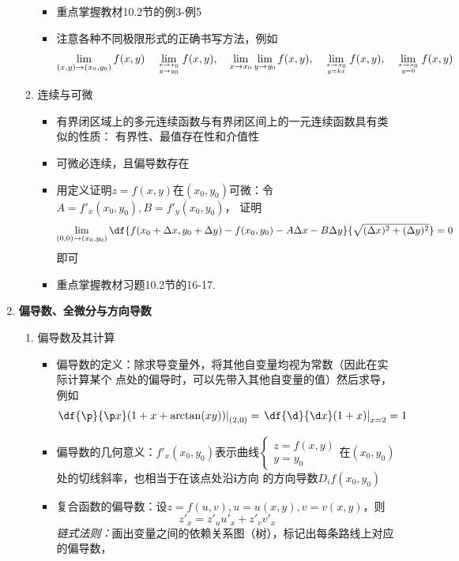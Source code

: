 \begin{enumerate}
\begin{enumerate}[(1)]
\begin{itemize}
      \item 重点掌握教材10.2节的例3-例5
      \item 注意各种不同极限形式的正确书写方法，例如
      $$\lim\limits_{(x,y)\to(x_0,y_0)}f(x,y)\quad
      \lim\limits_{x\to x_0\atop y\to y_0}f(x,y),\quad
      \lim\limits_{x\to x_0}\lim\limits_{y\to y_0}f(x,y),\quad
      \lim\limits_{x\to x_0\atop y=kx}f(x,y),\quad
      \lim\limits_{x\to x_0\atop y=0}f(x,y)
      $$
    \end{itemize}
    \item 连续与可微
    \begin{itemize}
      \item 有界闭区域上的多元连续函数与有界闭区间上的一元连续函数具有类似的性质：
      有界性、最值存在性和介值性
      \item 可微必连续，且偏导数存在
      \item 用定义证明$z=f(x,y)$在$(x_0,y_0)$可微：令$A=f'_x(x_0,y_0),B=f'_y(x_0,y_0)$，
      证明
      $$\lim\limits_{(0,0)\to(x_0,y_0)}
      \df{f(x_0+\Delta x,y_0+\Delta y)-f(x_0,y_0)
      -A\Delta x-B\Delta
      y}{\sqrt{(\Delta x)^2+(\Delta y)^2}}=0$$
      即可
      \item 重点掌握教材习题10.2节的16-17.
    \end{itemize}
  \end{enumerate}
  \item {\bf 偏导数、全微分与方向导数}
  \begin{enumerate}[(1)]
    \item 偏导数及其计算
    \begin{itemize}
      \item 偏导数的定义：除求导变量外，将其他自变量均视为常数（因此在实际计算某个
      点处的偏导时，可以先带入其他自变量的值）然后求导，例如
      $$\left.\df{\p}{\p x}(1+x+\arctan(xy))\right|_{(2,0)}=
      \left.\df{\d}{\d x}(1+x)\right|_{x=2}=1$$
      \item 偏导数的几何意义：$f'_x(x_0,y_0)$表示曲线$\left\{\begin{array}{l}
      z=f(x,y)\\ y=y_0
      \end{array}\right.$在$(x_0,y_0)$处的切线斜率，也相当于在该点处沿$\bm{i}$方向
      的方向导数$D_if(x_0,y_0)$
      \item 复合函数的偏导数：设$z=f(u,v),u=u(x,y),v=v(x,y)$，则
      $$z'_x=z'_uu'_x+z'_vv'_x$$
      {\it 链式法则：}画出变量之间的依赖关系图（树），标记出每条路线上对应的偏导数，

\end{itemize}
\end{enumerate}
\end{enumerate}
